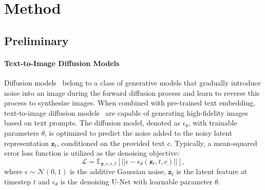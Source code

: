 \section{Method}
\vspace{-0.3em}
\subsection{Preliminary}
\vspace{-0.3em}
\paragraph{Text-to-Image Diffusion Models}
Diffusion models~\citep{ddpm, ddim} belong to a class of generative models that gradually introduce noise into an image during the forward diffusion process and learn to reverse this process to synthesize images. When combined with pre-trained text embedding, text-to-image diffusion models~\citep{sdxl, sd3} are capable of generating high-fidelity images based on text prompts. The diffusion model, denoted as $\epsilon_{\theta}$, with trainable parameters $\theta$, is optimized to predict the noise added to the noisy latent representation $\mathbf{z}_{t}$, conditioned on the provided text $c$. Typically, a mean-squared error loss function is utilized as the denoising objective:
\begin{equation}
    \label{diffusion}
    \mathcal{L} = \mathbb{E}_{\mathbf{z},c,\epsilon,t}[||\epsilon-\epsilon_{\theta}\left(\mathbf{z}_{t},t,c\right)||],
\end{equation}
where $\epsilon\sim \mathcal{N}(0,1)$ is the additive Gaussian noise, $\mathbf{z}_{t}$ is the latent feature at timestep $t$ and $\epsilon_{\theta}$ is the denoising U-Net with learnable parameter $\theta$.


